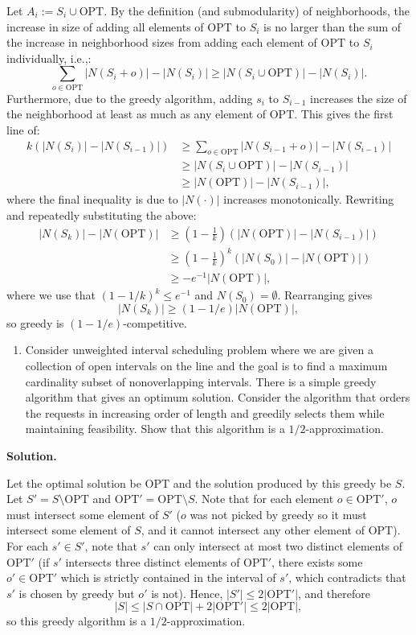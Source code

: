 \documentclass[11pt,letterpaper]{article}
\theoremstyle{definition}
\newcommand{\OPT}{\mathrm{OPT}}
\newcommand{\solution}{\medskip\noindent\textbf{Solution.}\par\medskip}
\begin{document}
Let $A_i := S_i \cup \OPT$.
By the definition (and submodularity) of neighborhoods, the increase in size of adding all elements of $\OPT$ to $S_i$ is no larger than the sum of the increase in neighborhood sizes from adding each element of $\OPT$ to $S_i$ individually, i.e.,:
\[
\sum_{o\in \OPT} |N(S_i+o)| - |N(S_i)| \geq |N(S_i\cup\OPT)| - |N(S_i)|.
\]
Furthermore, due to the greedy algorithm, adding $s_{i}$ to $S_{i-1}$ increases the size of the neighborhood at least as much as any element of $\OPT$. This gives the first line of:
\begin{align*}
    k(|N(S_{i})| - |N(S_{i-1})|) & \geq \sum_{o\in \OPT} |N(S_{i-1} + o)| - |N(S_{i-1})| \\
    & \geq |N(S_i\cup\OPT)| - |N(S_{i-1})| \\
    & \geq |N(\OPT)| - |N(S_{i-1})|,
\end{align*}
where the final inequality is due to $|N(\cdot)|$ increases monotonically.
Rewriting and repeatedly substituting the above:
\begin{align*}
    |N(S_k)| - |N(\OPT)| &\geq \left(1-\frac{1}{k}\right)(|N(\OPT)| - |N(S_{i-1})|) \\
    & \geq \left(1-\frac{1}{k}\right)^k (|N(S_0)| - |N(\OPT)|) \\
    &\geq -e^{-1} |N(\OPT)|,
\end{align*}
where we use that $(1-1/k)^k \leq e^{-1}$ and $N(S_0) = \emptyset$.
Rearranging gives 
\[
|N(S_k)| \geq (1-1/e)|N(\OPT)|,\]
so greedy is $(1-1/e)$-competitive.






\begin{enumerate}[resume=q]
\item Consider unweighted interval scheduling problem where we are given a collection of open intervals on the line and the goal is to find a maximum cardinality subset of nonoverlapping intervals. There is a simple greedy algorithm that gives an optimum solution. Consider the algorithm that orders the requests in increasing order of length and greedily selects them while maintaining feasibility. Show that this algorithm is a $1/2$-approximation.
\end{enumerate}

\solution
Let the optimal solution be $\OPT$ and the solution produced by this greedy be $S$. 
Let $S' = S\setminus \OPT$ and $\OPT' = \OPT\setminus S$.
Note that for each element $o\in \OPT'$, $o$ must intersect some element of $S'$ ($o$ was not picked by greedy so it must intersect some element of $S$, and it cannot intersect any other element of $\OPT$).
For each $s'\in S'$, note that $s'$ can only intersect at most two distinct elements of $\OPT'$ (if $s'$ intersects three distinct elements of $\OPT'$, there exists some $o'\in \OPT'$ which is strictly contained in the interval of $s'$, which contradicts that $s'$ is chosen by greedy but $o'$ is not).
Hence, $|S'|\leq 2|\OPT'|$, and therefore 
\[
|S| \leq |S\cap\OPT| + 2|\OPT'| \leq 2|\OPT|,
\]
so this greedy algorithm is a $1/2$-approximation.
\end{document}
